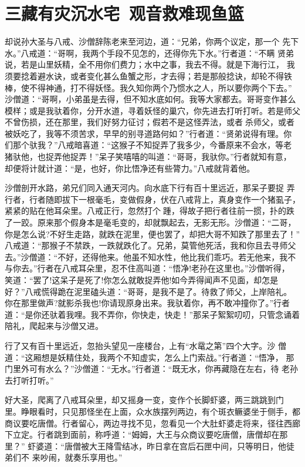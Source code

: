 \chapter{三藏有灾沉水宅~观音救难现鱼篮}

却说孙大圣与八戒、沙僧辞陈老来至河边，道：“兄弟，你两个议定，那一个
先下水。”八戒道：“哥啊，我两个手段不见怎的，还得你先下水。”行者道：“不瞒
贤弟说，若是山里妖精，全不用你们费力；水中之事，我去不得。就是下海行江，
我须要捻着避水诀，或者变化甚么鱼蟹之形，才去得；若是那般捻诀，却轮不得铁
棒，使不得神通，打不得妖怪。我久知你两个乃惯水之人，所以要你两个下去。”
沙僧道：“哥啊，小弟虽是去得，但不知水底如何。我等大家都去。哥哥变作甚么
模样；或是我驮着你，分开水道，寻着妖怪的巢穴，你先进去打听打听。若是师父
不曾伤损，还在那里，我们好努力征讨；假若不是这怪弄法，或者杀师父，或者
被妖吃了，我等不须苦求，早早的别寻道路何如？”行者道：“贤弟说得有理。你
们那个驮我？”八戒暗喜道：“这猴子不知捉弄了我多少，今番原来不会水，等老
猪驮他，也捉弄他捉弄！”呆子笑嘻嘻的叫道：“哥哥，我驮你。”行者就知有意，
却便将计就计道：“是，也好，你比悟净还有些膂力。”八戒就背着他。

沙僧剖开水路，弟兄们同入通天河内。向水底下行有百十里远近，那呆子要捉
弄行者，行者随即拔下一根毫毛，变做假身，伏在八戒背上，真身变作一个猪虱子，
紧紧的贴在他耳朵里。八戒正行，忽然打个踵，得故子把行者往前一掼，扑的跌
了一跤。原来那个假身本是毫毛变的，却就飘起去，无影无形。沙僧道：“二哥，
你是怎么说?不好生走路，就跌在泥里，便也罢了，却把大哥不知跌了那里去了！”
八戒道：“那猴子不禁跌，一跌就跌化了。兄弟，莫管他死活，我和你且去寻师父
去。”沙僧道：“不好，还得他来。他虽不知水性，他比我们乖巧。若无他来，我不
与你去。”行者在八戒耳朵里，忍不住高叫道：“悟净!老孙在这里也。”沙僧听得，
笑道：“罢了!这呆子是死了!你怎么就敢捉弄他!如今弄得闻声不见面，却怎是
好？”八戒慌得跪在泥里磕头道：“哥哥，是我不是了。待救了师父，上岸陪礼。
你在那里做声?就影杀我也!你请现原身出来。我驮着你，再不敢冲撞你了。”行者
道：“是你还驮着我哩。我不弄你，你快走，快走！”那呆子絮絮叨叨，只管念诵着
陪礼，爬起来与沙僧又进。

行了又有百十里远近，忽抬头望见一座楼台，上有“水鼋之第”四个大字。沙
僧道：“这厢想是妖精住处，我两个不知虚实，怎么上门索战。”行者道：“悟净，
那门里外可有水么？”沙僧道：“无水。”行者道：“既无水，你再藏隐在左右，待
老孙去打听打听。”

好大圣，爬离了八戒耳朵里，却又摇身一变，变作个长脚虾婆，两三跳跳到门
里。睁眼看时，只见那怪坐在上面，众水族摆列两边，有个斑衣鳜婆坐于侧手，都
商议要吃唐僧。行者留心，两边寻找不见，忽看见一个大肚虾婆走将来，径往西廊
下立定。行者跳到面前，称呼道：“姆姆，大王与众商议要吃唐僧，唐僧却在那里？”
虾婆道：“唐僧被大王降雪结冰，昨日拿在宫后石匣中间，只等明日，他徒弟们不
来吵闹，就奏乐享用也。”


